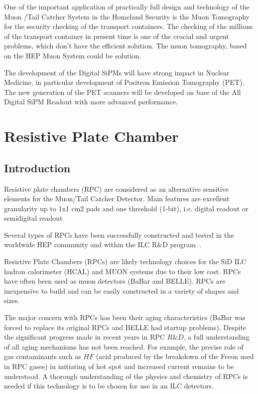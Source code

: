 \documentclass[12pt,twoside,a4paper]{book}
\begin{document}
One of the important application of practically full design and technology of the Muon /Tail Catcher System in the Homeland Security is the Muon Tomography for the security checking of the transport containers. The checking of the millions of the transport container in present time is one of the crucial and urgent problems, which don't have the efficient solution. The muon tomography, based on the HEP Muon System could be solution.

The development of the Digital SiPMs will have strong impact in Nuclear Medicine, in particular development of  Positron Emission Tomography (PET).  The new generation of the PET scanners will be developed on base of the All Digital SiPM Readout with more advanced performance.

\section{Resistive Plate Chamber }
\subsection{Introduction}

Resistive plate chambers (RPC) are considered as an alternative sensitive elements for the Muon/Tail Catcher Detector.
Main features are excellent granularity up to 1x1 cm2 pads and one threshold (1-bit), i.e. digital readout or semidigital readout

Several types of RPCs have been successfully constructed and tested in the worldwide HEP community and within the ILC R\&D program~\cite{}.

Resistive Plate Chambers (RPCs) are likely technology choices for the SiD ILC hadron calorimeter (HCAL) and MUON systems due to their low cost.
RPCs have often been used as muon detectors (BaBar and BELLE). RPCs are inexpensive to build and can be easily constructed in a variety of shapes and sizes.

The major concern with RPCs has been their aging characteristics (BaBar was forced to replace its original RPCs and BELLE had startup problems).
Despite the significant progress made in recent years in RPC $R\&D$, a full understanding of all aging mechanisms has not been reached.
For example, the precise role of gas contaminants such as $HF$ (acid produced by the breakdown of the Freon used in RPC gases) in initiating of hot spot and increased current remains to be understood. A thorough understanding of the physics and chemistry of RPCs is needed if this technology is to be chosen for use in an ILC detectors.
\end{document}
